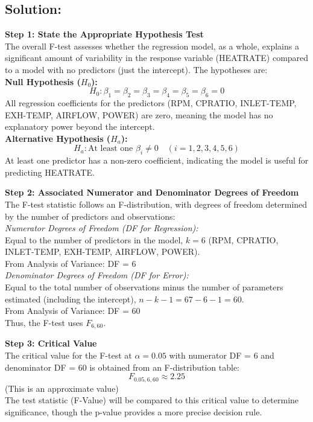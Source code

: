 \documentclass{article}
\begin{document}
\subsection*{Solution:}
\textbf{Step 1: State the Appropriate Hypothesis Test} \\
The overall F-test assesses whether the regression model, as a whole, explains a significant amount of variability in the response variable (HEATRATE) compared to a model with no predictors (just the intercept). The hypotheses are: \\
\textbf{Null Hypothesis (\( H_0 \)):} 
\[
H_0: \beta_1 = \beta_2 = \beta_3 = \beta_4 = \beta_5 = \beta_6 = 0
\]
All regression coefficients for the predictors (RPM, CPRATIO, INLET-TEMP, EXH-TEMP, AIRFLOW, POWER) are zero, meaning the model has no explanatory power beyond the intercept. \\
\textbf{Alternative Hypothesis (\( H_a \)):} 
\[
H_a: \text{At least one } \beta_i \neq 0 \quad (i = 1, 2, 3, 4, 5, 6)
\]
At least one predictor has a non-zero coefficient, indicating the model is useful for predicting HEATRATE.

\textbf{Step 2: Associated Numerator and Denominator Degrees of Freedom} \\
The F-test statistic follows an F-distribution, with degrees of freedom determined by the number of predictors and observations: \\
\textit{Numerator Degrees of Freedom (DF for Regression):} \\
Equal to the number of predictors in the model, \( k = 6 \) (RPM, CPRATIO, INLET-TEMP, EXH-TEMP, AIRFLOW, POWER). \\
From Analysis of Variance: DF = 6 \\
\textit{Denominator Degrees of Freedom (DF for Error):} \\
Equal to the total number of observations minus the number of parameters estimated (including the intercept), \( n - k - 1 = 67 - 6 - 1 = 60 \). \\
From Analysis of Variance: DF = 60 \\
Thus, the F-test uses \( F_{6,60} \).

\textbf{Step 3: Critical Value} \\
The critical value for the F-test at \( \alpha = 0.05 \) with numerator DF = 6 and denominator DF = 60 is obtained from an F-distribution table: 
\[
F_{0.05, 6, 60} \approx 2.25
\]
(This is an approximate value) \\
The test statistic (F-Value) will be compared to this critical value to determine significance, though the p-value provides a more precise decision rule.
\end{document}
